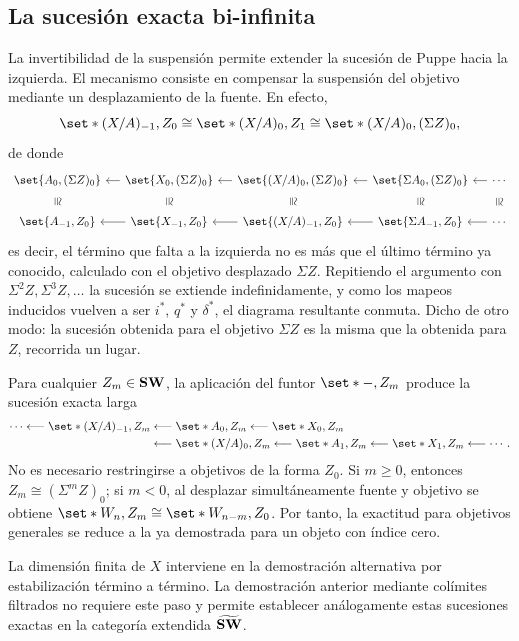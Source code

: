 \subsection{La sucesión exacta bi-infinita}
La invertibilidad de la suspensión permite extender la sucesión de Puppe hacia la izquierda. El mecanismo consiste en compensar la suspensión del objetivo mediante un desplazamiento de la fuente. En efecto,
\[
\set*{(X/A)_{-1},Z_0}\cong\set*{(X/A)_0,Z_1}\cong\set*{(X/A)_0,(\Sigma Z)_0},
\]
de donde
\[
\begin{tikzcd}[column sep=small]
{\set{A_0,(\Sigma Z)_0}} \arrow[d, phantom, "\cong" sloped] & {\set{X_0,(\Sigma Z)_0}} \arrow[d, phantom, "\cong" sloped] \arrow[l] & {\set{(X/A)_0,(\Sigma Z)_0}} \arrow[d, phantom, "\cong" sloped] \arrow[l] & {\set{\Sigma A_0,(\Sigma Z)_0}} \arrow[d, phantom, "\cong" sloped] \arrow[l] & \cdots \arrow[d, phantom, "\cong" sloped] \arrow[l]\\
{\set{A_{-1},Z_0}} & {\set{X_{-1},Z_0}} \arrow[l] & {\set{(X/A)_{-1},Z_0}} \arrow[l] & {\set{\Sigma A_{-1},Z_0}} \arrow[l] & \cdots \arrow[l]
\end{tikzcd}
\]
es decir, el término que falta a la izquierda no es más que el último término ya conocido, calculado con el objetivo desplazado $\Sigma Z$. Repitiendo el argumento con $\Sigma^2Z,\Sigma^3Z,\dots$ la sucesión se extiende indefinidamente, y como los mapeos inducidos vuelven a ser $i^*$, $q^*$ y $\delta^*$, el diagrama resultante conmuta. Dicho de otro modo: la sucesión obtenida para el objetivo $\Sigma Z$ es la misma que la obtenida para $Z$, recorrida un lugar.

Para cualquier $Z_m\in\mathbf{SW}$, la aplicación del funtor $\set*{-,Z_m}$ produce la sucesión exacta larga
\[
\begin{aligned}
\cdots\longleftarrow\set*{(X/A)_{-1},Z_m}&\longleftarrow\set*{A_0,Z_m}\longleftarrow\set*{X_0,Z_m}\\
&\longleftarrow\set*{(X/A)_0,Z_m}\longleftarrow\set*{A_1,Z_m}\longleftarrow\set*{X_1,Z_m}\longleftarrow\cdots .
\end{aligned}
\]
No es necesario restringirse a objetivos de la forma $Z_0$. Si $m\geq0$, entonces $Z_m\cong(\Sigma^mZ)_0$; si $m<0$, al desplazar simultáneamente fuente y objetivo se obtiene $\set*{W_n,Z_m}\cong\set*{W_{n-m},Z_0}$. Por tanto, la exactitud para objetivos generales se reduce a la ya demostrada para un objeto con índice cero.

La dimensión finita de $X$ interviene en la demostración alternativa por estabilización término a término. La demostración anterior mediante colímites filtrados no requiere este paso y permite establecer análogamente estas sucesiones exactas en la categoría extendida $\widetilde{\mathbf{SW}}$.

